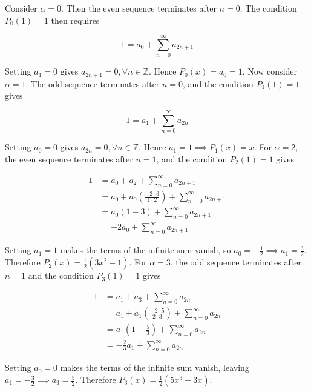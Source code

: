 \documentclass{article}
\begin{document}
\hfill \break
Consider $\alpha = 0$. Then the even sequence terminates after $n = 0$. The condition $P_0(1) = 1$ then requires

\begin{equation*}
    1 = a_0 + \sum\limits_{n = 0}^\infty a_{2n + 1}
\end{equation*}

Setting $a_1 = 0$ gives $a_{2n + 1} = 0, \forall n \in \mathbb{Z}$. Hence $P_0(x) = a_0 = 1$. Now consider $\alpha = 1$. The odd sequence terminates
after $n = 0$, and the condition $P_1(1) = 1$ gives

\begin{equation*}
    1 = a_1 + \sum\limits_{n = 0}^\infty a_{2n}
\end{equation*}

Setting $a_0 = 0$ gives $a_{2n} = 0, \forall n \in \mathbb{Z}$. Hence $a_1 = 1 \implies P_1(x) = x$. For $\alpha = 2$, the even sequence terminates
after $n = 1$, and the condition $P_2(1) = 1$ gives

\begin{align*}
    1 &= a_0 + a_2 + \sum_{n = 0}^\infty a_{2n + 1}\\
    &= a_0 + a_0\left(\frac{-2\cdot3}{1\cdot2}\right) + \sum_{n = 0}^\infty a_{2n + 1}\\
    &= a_0(1 - 3) + \sum_{n = 0}^\infty a_{2n + 1}\\
    &= -2a_0 + \sum_{n = 0}^\infty a_{2n + 1}
\end{align*}

Setting $a_1 = 1$ makes the terms of the infinite sum vanish, so $a_0 = -\frac{1}{2} \implies a_1 = \frac{3}{2}$. Therefore $P_2(x) = \frac{1}{2}(3x^2 - 1)$.
For $\alpha = 3$, the odd sequence terminates after $n = 1$ and the condition $P_3(1) = 1$ gives

\begin{align*}
    1 &= a_1 + a_3 + \sum\limits_{n = 0}^\infty a_{2n}\\
    &= a_1 + a_1\left(\frac{-2\cdot5}{2\cdot3}\right) + \sum\limits_{n = 0}^\infty a_{2n}\\
    &= a_1\left(1 - \frac{5}{3}\right) + \sum\limits_{n = 0}^\infty a_{2n}\\
    &= -\frac{2}{3}a_1 + \sum\limits_{n = 0}^\infty a_{2n}
\end{align*}

Setting $a_0 = 0$ makes the terms of the infinite sum vanish, leaving $a_1 = -\frac{3}{2} \implies a_3 = \frac{5}{2}$.
Therefore $P_3(x) = \frac{1}{2}(5x^3 - 3x)$.
\end{document}
